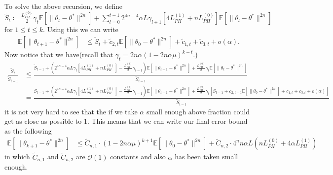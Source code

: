 \documentclass[a4paper]{article}
\newcommand{\norm}[1]{\|#1 \|}
\newcommand{\Exs}{\mathbb{E}}
\newcommand{\thetastar}{\theta^*}
\newcommand{\constLPH}[1]{L_{PH}^{(#1)}}
\newcommand{\stepsize}{\alpha}
\begin{document}
	To solve the above recursion, we define $\tilde{S}_{t} \coloneq \frac{\constLPH{0}}{2}\gamma_{t}\Exs\left[\norm{\theta_{t} - \thetastar}^{2n}\right] + \sum_{l = 0}^{t - 1}2^{4n - 4}\stepsize L \gamma_{l + 1}\left[4\constLPH{1} + n\constLPH{0}\right]\Exs\left[\norm{\theta_{l} - \thetastar}^{2n}\right]$ for $1 \leq t \leq k$. Using this we can write
	\begin{align*}
		\Exs\left[\norm{\theta_{t + 1} - \thetastar}^{2n}\right] & \leq \tilde{S}_{t} + \tilde{c}_{2, t}\Exs\left[\norm{\theta_{0} - \thetastar}^{2n}\right] + \tilde{c}_{1, t} + \tilde{c}_{3, t} + o\left(\stepsize\right).
	\end{align*}
	Now notice that we have(recall that $\gamma_{t} = 2n\stepsize\left(1 - 2n\stepsize\mu\right)^{k - t}$.)
	\begin{align*}
		\frac{\tilde{S}_{t}}{\tilde{S}_{t - 1}} &‌ \leq \frac{\tilde{S}_{t - 1} + \left(2^{4n - 4}\stepsize L \gamma_{t}\left[4\constLPH{1} + n\constLPH{0}\right] - \frac{\constLPH{0}}{2}\gamma_{t - 1}\right)\Exs\left[\norm{\theta_{t - 1} - \thetastar}^{2n}\right] + \frac{\constLPH{0}}{2}\gamma_{t}\Exs\left[\norm{\theta_{t} - \thetastar}^{2n}\right]}{\tilde{S}_{t - 1}}\\
		& = \frac{\tilde{S}_{t - 1} + \left(2^{4n - 4}\stepsize L \gamma_{t}\left[4\constLPH{1} + n\constLPH{0}\right] - \frac{\constLPH{0}}{2}\gamma_{t - 1}\right)\Exs\left[\norm{\theta_{t - 1} - \thetastar}^{2n}\right] + \frac{\constLPH{0}}{2}\gamma_{t}\left[\tilde{S}_{t - 1} + \tilde{c}_{2, t - 1}\Exs\left[\norm{\theta_{0} - \thetastar}^{2n}\right] + \tilde{c}_{1, t} + \tilde{c}_{3, t} + o\left(\stepsize\right)\right]}{\tilde{S}_{t - 1}}
	\end{align*}
	it is not very hard to see that the if we take $\stepsize$ small enough above fraction could get as close as possible to $1$. This means that we can write our final error bound as the following
	\begin{align*}
		\Exs\left[\norm{\theta_{k +‌ 1} - \thetastar}^{2n}\right] & \leq \tilde{C}_{n, 1} \cdot \left(1 - 2n\stepsize\mu\right)^{k + 1}\Exs\left[\norm{\theta_{0} - \thetastar}^{2n}\right] + \tilde{C}_{n, 2} \cdot 4^{n}n\stepsize L\left(n\constLPH{0} + 4\stepsize \constLPH{1}\right)
	\end{align*}
	in which $\tilde{C}_{n, 1}$ and $\tilde{C}_{n, 2}$ are $\mathcal{O}(1)$ constants and also $\stepsize$ has been taken small enough.
	 
	
	
	
\end{document}
